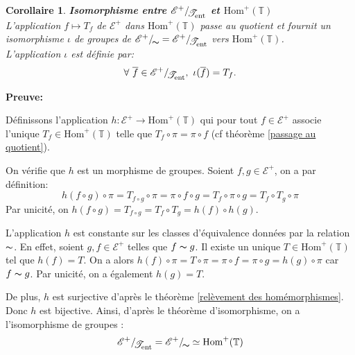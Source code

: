 \documentclass[11pt,a4 paper]{article}
\newtheorem{corollaire}[theoreme]{Corollaire}
\newcommand{\Tbb}{\mathbb{T}}
\newcommand{\Ec}{\mathcal{E}}
\newcommand{\HomT}{\mathrm{Hom}^+(\Tbb)}
\newcommand{\Tent}{\mathcal{T}_{\mathrm{ent}}}
\newcommand*{\EnsembleQuotient}[2]%
{\ensuremath{%
		#1/\!\raisebox{-.65ex}{\ensuremath{\mathcal{#2}}}}}
\newenvironment{coro}{\begin{box_coro}\begin{corollaire}}{\end{corollaire}\end{box_coro}}
\begin{document}
\begin{coro}\label{isom relation d'équiv sur les homéo}\textbf{Isomorphisme entre $\EnsembleQuotient{\mathcal{E}^+}{\Tent}$ et $\HomT$}\\
	L'application $f\mapsto T_f$ de $\Ec^+$ dans $\HomT$ passe au quotient et fournit un isomorphisme $\iota$ de groupes de $\EnsembleQuotient{\Ec^+}{\thicksim}=\EnsembleQuotient{\Ec^+}{\Tent}$ vers $\HomT$.\\
	L'application $\iota$ est définie par:
	$$\forall \ \overline{f} \in \EnsembleQuotient{\Ec^+}{\Tent}, \ \iota(\overline{f})= T_f.$$
\end{coro}
	
	
	\textbf{Preuve:}		
	\par Définissons l'application $h: \Ec^+ \to \mathrm{Hom}^+(\Tbb)$ qui pour tout $f \in \Ec^+$ associe l'unique $T_f \in \mathrm{Hom}^+(\Tbb)$ telle que $T_f\circ\pi=\pi\circ f$ (cf théorème \ref{passage au quotient}). \\
	
	\par On vérifie que $h$ est un morphisme de groupes. Soient $f, g \in \Ec^+$, on a par définition:
	$$h(f\circ g)\circ \pi = T_{f\circ g}\circ\pi=\pi\circ f \circ g=T_f\circ\pi\circ g= T_f\circ T_g \circ \pi$$
	Par unicité, on $h(f\circ g)= T_{f\circ g}= T_f \circ T_g=h(f)\circ h(g)$.\\
	
	
	\par L'application $h$ est constante sur les classes d'équivalence données par la relation $\thicksim$. En effet, soient $g, f \in \Ec^+$ telles que $f\thicksim g$. Il existe un unique $T \in \mathrm{Hom}^+(\Tbb)$ tel que $h(f)=T$. On a alors $h(f)\circ \pi=T\circ\pi=\pi\circ f = \pi \circ g=h(g)\circ \pi$ car $f \thicksim g$. Par unicité, on a également $h(g)=T$.\\
	\par De plus, $h$ est surjective d'après le théorème \ref{relèvement des homémorphismes}.  Donc $h$ est bijective. Ainsi, d'après le théorème d'isomorphisme, on a l'isomorphisme de groupes :
	 $$\EnsembleQuotient{\mathcal{E}^+}{\Tent} =\EnsembleQuotient{\mathcal{E}^+}{\thicksim} \simeq \mathrm{Hom}^+(\Tbb)$$	 
	
	 
\end{document}
